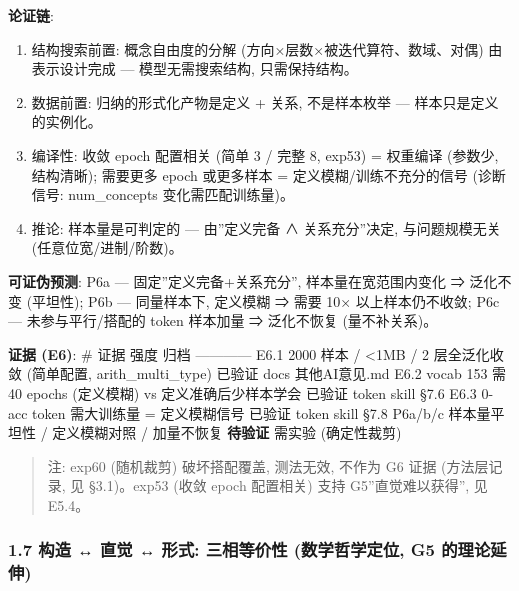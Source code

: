 \documentclass[
]{article}
\providecommand{\tightlist}{%
  \setlength{\itemsep}{0pt}\setlength{\parskip}{0pt}}
\begin{document}
\textbf{论证链}:

\begin{enumerate}
\def\labelenumi{\arabic{enumi}.}
\tightlist
\item
  结构搜索前置: 概念自由度的分解 (方向×层数×被迭代算符、数域、对偶)
  由表示设计完成 --- 模型无需搜索结构, 只需保持结构。
\item
  数据前置: 归纳的形式化产物是定义 + 关系, 不是样本枚举 ---
  样本只是定义的实例化。
\item
  编译性: 收敛 epoch 配置相关 (简单 3 / 完整 8, exp53) = 权重编译
  (参数少, 结构清晰); 需要更多 epoch 或更多样本 =
  定义模糊/训练不充分的信号 (诊断信号: num\_concepts 变化需匹配训练量)。
\item
  推论: 样本量是可判定的 --- 由''定义完备 ∧ 关系充分''决定,
  与问题规模无关 (任意位宽/进制/阶数)。
\end{enumerate}

\textbf{可证伪预测}: P6a --- 固定''定义完备+关系充分'',
样本量在宽范围内变化 ⇒ 泛化不变 (平坦性); P6b --- 同量样本下, 定义模糊 ⇒
需要 10× 以上样本仍不收敛; P6c --- 未参与平行/搭配的 token 样本加量 ⇒
泛化不恢复 (量不补关系)。

\textbf{证据 (E6)}: \textbar{} \# \textbar{} 证据 \textbar{} 强度
\textbar{} 归档 \textbar{}
\textbar---\textbar---\textbar---\textbar---\textbar{} \textbar{} E6.1
\textbar{} 2000 样本 / \textless1MB / 2 层全泛化收敛 (简单配置,
arith\_multi\_type) \textbar{} 已验证 \textbar{} docs 其他AI意见.md
\textbar{} \textbar{} E6.2 \textbar{} vocab 153 需 40 epochs (定义模糊)
vs 定义准确后少样本学会 \textbar{} 已验证 \textbar{} token skill §7.6
\textbar{} \textbar{} E6.3 \textbar{} 0-acc token 需大训练量 =
定义模糊信号 \textbar{} 已验证 \textbar{} token skill §7.8 \textbar{}
\textbar{} P6a/b/c \textbar{} 样本量平坦性 / 定义模糊对照 / 加量不恢复
\textbar{} \textbf{待验证} \textbar{} 需实验 (确定性裁剪) \textbar{}

\begin{quote}
注: exp60 (随机裁剪) 破坏搭配覆盖, 测法无效, 不作为 G6 证据 (方法层记录,
见 §3.1)。exp53 (收敛 epoch 配置相关) 支持 G5''直觉难以获得'', 见 E5.4。
\end{quote}

\subsubsection{1.7 构造 ↔ 直觉 ↔ 形式: 三相等价性 (数学哲学定位, G5
的理论延伸)}\label{ux6784ux9020-ux76f4ux89c9-ux5f62ux5f0f-ux4e09ux76f8ux7b49ux4ef7ux6027-ux6570ux5b66ux54f2ux5b66ux5b9aux4f4d-g5-ux7684ux7406ux8bbaux5ef6ux4f38}
\end{document}
